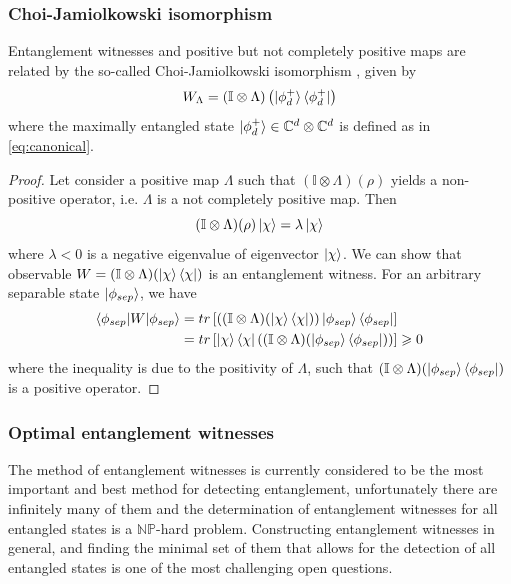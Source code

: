 \documentclass[10pt,a4paper]{book}
\numberwithin{equation}{chapter}
\numberwithin{figure}{chapter}
\numberwithin{table}{chapter}
\begin{document}
\subsubsection{Choi-Jamiolkowski isomorphism}
Entanglement witnesses and positive but not completely positive maps are related by the so-called Choi-Jamiolkowski isomorphism \cite{choi}\cite{jamiol}, given by
\begin{equation}
W_{\Lambda}=(\mathbb{I} \otimes \Lambda)\left( \ket{\phi^{+}_d}\bra{\phi^{+}_d}\right)
\end{equation}
where the maximally entangled state $\ket{\phi^{+}_d}\in \mathbb{C}^{d}\otimes \mathbb{C}^d$ is defined as in \autoref{eq:canonical}.
\begin{proof}
Let consider a positive map $\Lambda$ such that $(\mathbb{I} \otimes \Lambda)(\rho)$ yields a non-positive operator, i.e. $\Lambda$ is a not completely positive map. Then 
\begin{equation}
(\mathbb{I} \otimes \Lambda)(\rho)\ket{\chi}=\lambda \ket{\chi}
\end{equation}
where $\lambda < 0$ is a negative eigenvalue of eigenvector $\ket{\chi}$. We can show that observable $W=(\mathbb{I} \otimes \Lambda)(\ket{\chi}\bra{\chi})$ is an entanglement witness. For an arbitrary separable state $\ket{\phi_{sep}}$, we have
\begin{align}
\braket{\phi_{sep}|W|\phi_{sep}}&=tr \left[ \left( (\mathbb{I} \otimes \Lambda)(\ket{\chi}\bra{\chi})\right) \ket{\phi_{sep}}\bra{\phi_{sep}} \right] \\
&= tr \left[ \ket{\chi}\bra{\chi}\left( (\mathbb{I} \otimes \Lambda)(\ket{\phi_{sep}}\bra{\phi_{sep}})\right)  \right] \geqslant 0
\end{align}
where the inequality is due to the positivity of $\Lambda$, such that $(\mathbb{I} \otimes \Lambda)(\ket{\phi_{sep}}\bra{\phi_{sep}})$ is a positive operator. 
\end{proof}

\subsubsection{Optimal entanglement witnesses}
The method of entanglement witnesses is currently considered to be the most important and best
method for detecting entanglement, unfortunately there are infinitely many of them and the determination of entanglement witnesses for all entangled states is a $\mathbb{NP}$-hard problem. 
Constructing entanglement witnesses in general, and finding the minimal set of them that allows for the detection of all entangled states is one of the most challenging open questions.
\end{document}
